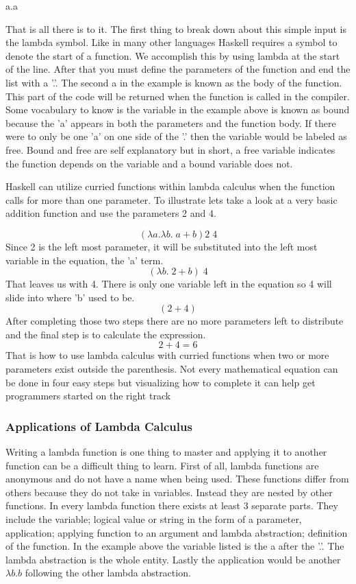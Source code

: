 \documentclass{article}
\begin{document}
    \medskip
              \lambda a.a
    \medskip
    
    \noindent That is all there is to it. The first thing to break down about this simple input is the lambda symbol. Like in many other languages Haskell requires a symbol to denote the start of a function. We accomplish this by using lambda at the start of the line. After that you must define the parameters of the function and end the list with a '.'. The second a in the example is known as the body of the function. This part of the code will be returned when the function is called in the compiler. Some vocabulary to know is the variable in the example above is known as bound because the 'a' appears in both the parameters and the function body. If there were to only be one 'a' on one side of the '.' then the variable would be labeled as free. Bound and free are self explanatory but in short, a free variable indicates the function depends on the variable and a bound variable does not. 
    
    Haskell can utilize curried functions within lambda calculus when the function calls for more than one parameter. To illustrate lets take a look at a very basic addition function and use the parameters 2 and 4.
    
    $$(\lambda a. \lambda b. \;a + b)2\; 4$$
   Since 2 is the left most parameter, it will be substituted into the left most variable in the equation, the 'a' term.
   $$(\lambda b. \;2 + b)\; 4$$
   That leaves us with 4. There is only one variable left in the equation so 4 will slide into where 'b' used to be.
   $$(2 + 4)$$
   After completing those two steps there are no more parameters left to distribute and the final step is to calculate the expression.
   $$2 + 4 = 6$$
   That is how to use lambda calculus with curried functions when two or more parameters exist outside the parenthesis. Not every mathematical equation can be done in four easy steps but visualizing how to complete it can help get programmers started on the right track
    
        \subsubsection{Applications of Lambda Calculus}
        Writing a lambda function is one thing to master and applying it to another function can be a difficult thing to learn. First of all, lambda functions are anonymous and do not have a name when being used. These functions differ from others because they do not take in variables. Instead they are nested by other functions. In every lambda function there exists at least 3 separate parts. They include the variable; logical value or string in the form of a parameter, application; applying function to an argument and lambda abstraction; definition of the function. In the example above the variable listed is the a after the '.'. The lambda abstraction is the whole entity. Lastly the application would be another $\lambda b.b$ following the other lambda abstraction. 
        
\end{document}
